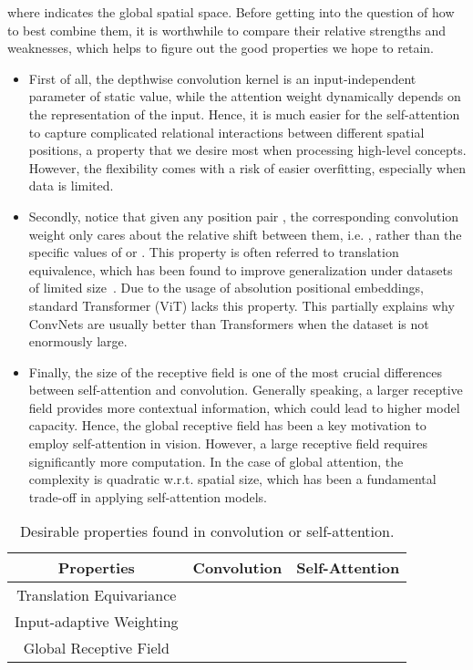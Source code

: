 \documentclass{article}
\begin{document}
where  indicates the global spatial space.
Before getting into the question of how to best combine them, it is worthwhile to compare their relative strengths and weaknesses, which helps to figure out the good properties we hope to retain.
\begin{itemize}[leftmargin=*,itemsep=0pt,topsep=0pt]
\item First of all, the depthwise convolution kernel  is an input-independent parameter of static value, while the attention weight  dynamically depends on the representation of the input.
Hence, it is much easier for the self-attention to capture complicated relational interactions between different spatial positions, a property that we desire most when processing high-level concepts.
However, the flexibility comes with a risk of easier overfitting, especially when data is limited.

\item Secondly, notice that given any position pair , the corresponding convolution weight  only cares about the relative shift between them, i.e. , rather than the specific values of  or .
This property is often referred to translation equivalence, which has been found to improve generalization under datasets of limited size~\cite{mohamed2020data}.
Due to the usage of absolution positional embeddings, standard Transformer (ViT) lacks this property.
This partially explains why ConvNets are usually better than Transformers when the dataset is not enormously large.

\item 
Finally, the size of the receptive field is one of the most crucial differences between self-attention and convolution.
Generally speaking, a larger receptive field provides more contextual information, which could lead to higher model capacity.
Hence, the global receptive field has been a key motivation to employ self-attention in vision.
However, a large receptive field requires significantly more computation.
In the case of global attention, the complexity is quadratic w.r.t. spatial size, which has been a fundamental trade-off in applying self-attention models.
\end{itemize}
\begin{table}[!ht]
    \centering
\caption{Desirable properties found in convolution or self-attention.}
    \begin{tabular}{c|c|c}
        \toprule
        \bf Properties & \bf Convolution & \bf Self-Attention  \\
        \midrule
        Translation Equivariance &  & \\
        Input-adaptive Weighting & &  \\
        Global Receptive Field   & &  \\
        \bottomrule
    \end{tabular}
    \label{tab:property_comparison}
\end{table}
\end{document}
